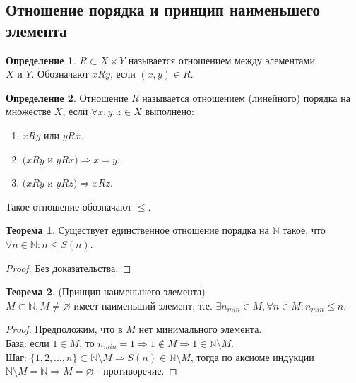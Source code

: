 \documentclass[a4paper, 12pt]{article}
\newcommand{\N}{\mathbb{N}}
\renewcommand{\emptyset}{\varnothing}
\theoremstyle{definition}
\newtheorem*{definition}{Определение}
\newtheorem*{theorem}{Теорема}
\begin{document}
    \subsection{Отношение порядка и принцип наименьшего элемента}
        \begin{definition}
            $R\subset X\times Y$ называется отношением между элементами\\ $X$ и $Y$. Обозначают $xRy$, если $(x,y)\in R$.
        \end{definition}
        \begin{definition}
            Отношение $R$ называется отношением (линейного) порядка на множестве $X$, если $\forall x,y,z\in X$ выполнено:
            \begin{enumerate}
                \item $xRy$ или $yRx$. 
                \item $(xRy$ и $yRx) \Rightarrow x=y$. 
                \item $(xRy$ и $yRz) \Rightarrow xRz$.
            \end{enumerate}
            Такое отношение обозначают $\leq$.
        \end{definition}
        \begin{theorem}
            Существует единственное отношение порядка на $\N$ такое, что\\
            $\forall n\in \N: n\leq S(n)$.
        \end{theorem}
        \begin{proof}
            Без доказательства.
        \end{proof} 
        \begin{theorem} (Принцип наименьшего элемента)\\
            $M\subset \N, M\ne \emptyset$ имеет наименьший элемент, т.е. $\exists n_{min}\in M, \forall n\in M: n_{min}\leq n$.
        \end{theorem} 
        \begin{proof}
            Предположим, что в $M$ нет минимального элемента.\\
            База: если $1\in M$, то $n_{min}=1 \Rightarrow 1\notin M \Rightarrow 1\in \N\setminus M$.\\
            Шаг: $\{1,2,\dots, n\}\subset \N\setminus M \Rightarrow S(n)\in \N\setminus M$, тогда по аксиоме индукции $\N\setminus M=\N\Rightarrow M = \emptyset$ - противоречие.
        \end{proof}
\end{document}
